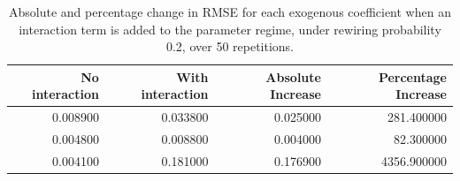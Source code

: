 \begin{table}
\caption{Absolute and percentage change in RMSE for each exogenous coefficient when an interaction term is added to the parameter regime, under rewiring probability 0.2, over 50 repetitions.}
\label{tab:rewiring_gamma_comparison}
\begin{tabular}{rrrr}
\toprule
No interaction & With interaction & Absolute Increase & Percentage Increase \\
\midrule
0.008900 & 0.033800 & 0.025000 & 281.400000 \\
0.004800 & 0.008800 & 0.004000 & 82.300000 \\
0.004100 & 0.181000 & 0.176900 & 4356.900000 \\
\bottomrule
\end{tabular}
\end{table}
